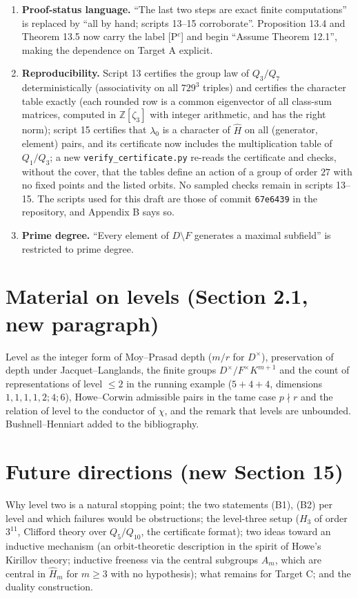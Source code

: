 \documentclass[11pt]{article}
\newcommand{\Z}{\mathbb Z}
\begin{document}
\begin{enumerate}[leftmargin=*]
$E$-depth-$5$ component is determined; hence $E^\times/F^\times E^{\times3}$
(order $9$) has basis the classes of $1+j$ and $1+\varpi^2j$, the
commutator pairing is nondegenerate on it, and
$[\widetilde{1+j},\widetilde{1+\varpi^2j}]=\kappa_{1,5}(1,1)=\zeta^{2\beta}\neq1$.
The consistency with the top-level Hilbert pairing of $E$ at level $6=pe_E/(p-1)$
is noted.
\item \textbf{Proof-status language.}  ``The last two steps are exact
finite computations'' is replaced by ``all by hand; scripts 13--15
corroborate''.  Proposition 13.4 and Theorem 13.5 now carry the label
[P$^c$] and begin ``Assume Theorem 12.1'', making the dependence on
Target A explicit.
\item \textbf{Reproducibility.}  Script 13 certifies the group law of
$Q_3/Q_7$ deterministically (associativity on all $729^3$ triples) and
certifies the character table exactly (each rounded row is a common
eigenvector of all class-sum matrices, computed in $\Z[\zeta_3]$ with
integer arithmetic, and has the right norm); script 15 certifies that
$\lambda_0$ is a character of $\hat H$ on all (generator, element) pairs,
and its certificate now includes the multiplication table of $Q_1/Q_3$;
a new \texttt{verify\_certificate.py} re-reads the certificate and
checks, without the cover, that the tables define an action of a group
of order $27$ with no fixed points and the listed orbits.  No sampled
checks remain in scripts 13--15.  The scripts used for this draft are
those of commit \texttt{67e6439} in the repository, and Appendix B says so.
\item \textbf{Prime degree.}  ``Every element of $D\setminus F$ generates
a maximal subfield'' is restricted to prime degree.
\end{enumerate}

\section*{Material on levels (Section 2.1, new paragraph)}
Level as the integer form of Moy--Prasad depth ($m/r$ for $D^\times$),
preservation of depth under Jacquet--Langlands, the finite groups
$D^\times/F^\times K^{m+1}$ and the count of representations of level
$\le2$ in the running example ($5+4+4$, dimensions $1,1,1,1,2;4;6$),
Howe--Corwin admissible pairs in the tame case $p\nmid r$ and the
relation of level to the conductor of $\chi$, and the remark that levels
are unbounded.  Bushnell--Henniart added to the bibliography.

\section*{Future directions (new Section 15)}
Why level two is a natural stopping point; the two statements (B1),
(B2) per level and which failures would be obstructions; the level-three
setup ($H_3$ of order $3^{11}$, Clifford theory over $Q_5/Q_{10}$, the
certificate format); two ideas toward an inductive mechanism (an
orbit-theoretic description in the spirit of Howe's Kirillov theory;
inductive freeness via the central subgroups $\hat A_m$, which are
central in $\hat H_m$ for $m\ge3$ with no hypothesis); what remains for
Target C; and the duality construction.
\end{document}
